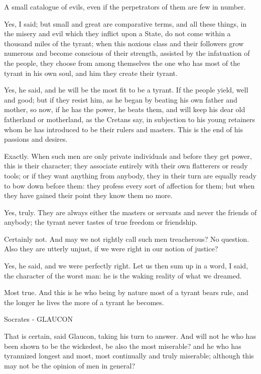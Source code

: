 A small catalogue of evils, even if the perpetrators of them are few in number.

Yes, I said; but small and great are comparative terms, and all these things, in the misery and evil which they inflict upon a State, do not come within a thousand miles of the tyrant; when this noxious class and their followers grow numerous and become conscious of their strength, assisted by the infatuation of the people, they choose from among themselves the one who has most of the tyrant in his own soul, and him they create their tyrant.

Yes, he said, and he will be the most fit to be a tyrant.
If the people yield, well and good; but if they resist him, as he began by beating his own father and mother, so now, if he has the power, he beats them, and will keep his dear old fatherland or motherland, as the Cretans say, in subjection to his young retainers whom he has introduced to be their rulers and masters. This is the end of his passions and desires.

Exactly.
When such men are only private individuals and before they get power, this is their character; they associate entirely with their own flatterers or ready tools; or if they want anything from anybody, they in their turn are equally ready to bow down before them: they profess every sort of affection for them; but when they have gained their point they know them no more.

Yes, truly.
They are always either the masters or servants and never the friends of anybody; the tyrant never tastes of true freedom or friendship.

Certainly not.
And may we not rightly call such men treacherous?
No question.
Also they are utterly unjust, if we were right in our notion of justice?

Yes, he said, and we were perfectly right.
Let us then sum up in a word, I said, the character of the worst man: he is the waking reality of what we dreamed.

Most true.
And this is he who being by nature most of a tyrant bears rule, and the longer he lives the more of a tyrant he becomes.

Socrates - GLAUCON

That is certain, said Glaucon, taking his turn to answer.
And will not he who has been shown to be the wickedest, be also the most miserable? and he who has tyrannized longest and most, most continually and truly miserable; although this may not be the opinion of men in general?

